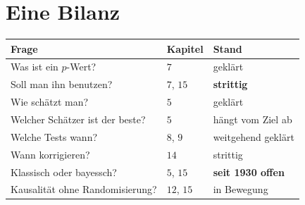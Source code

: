 \section{Eine Bilanz}

\begin{merksatz}
\begin{center}
{\small
\renewcommand{\arraystretch}{1.45}
\begin{tabular}{@{}P{3.4cm}P{2.2cm}P{2.6cm}@{}}
\toprule
\textbf{Frage} & \textbf{Kapitel} & \textbf{Stand}\\
\midrule
Was ist ein $p$-Wert? & $7$ & \textcolor{gruen}{geklärt}\\
Soll man ihn benutzen? & $7$, $15$ & \textcolor{akzent}{\textbf{strittig}}\\
Wie schätzt man? & $5$ & \textcolor{gruen}{geklärt}\\
Welcher Schätzer ist der beste? & $5$ & \textcolor{mittel}{hängt vom Ziel ab}\\
Welche Tests wann? & $8$, $9$ & \textcolor{gruen}{weitgehend geklärt}\\
Wann korrigieren? & $14$ & \textcolor{akzent}{strittig}\\
Klassisch oder bayessch? & $5$, $15$ & \textcolor{akzent}{\textbf{seit 1930 offen}}\\
Kausalität ohne Randomisierung? & $12$, $15$ & \textcolor{mittel}{in Bewegung}\\
\bottomrule
\end{tabular}}
\end{center}

\begin{center}
\begin{minipage}{0.88\textwidth}
\end{minipage}
\end{center}
\end{merksatz}

